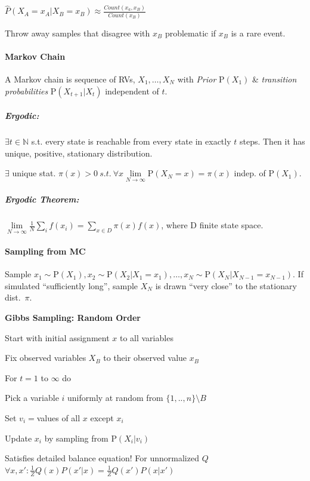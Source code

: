 \documentclass[a4paper, 10pt]{scrartcl}
\newcommand{\uP}{\mathrm P}
\begin{document}
\begin{multicols*}{3}
$\hat{P}(X_A = x_A | X_B = x_B) \approx \frac{Count(x_a, x_B)}{Count(x_B)}$

Throw away samples that disagree with $x_B$ problematic if $x_B$ is a rare event.

\paragraph{Markov Chain}

A Markov chain is sequence of RVs, $X_1,\dots,X_N$ with \emph{Prior} $\uP(X_1)$ \& \emph{transition probabilities} $\uP(X_{t+1} | X_t)$ independent of $t$.

\subparagraph{Ergodic:} $\exists t\in{\mathbb N}$ s.t. every state is reachable from every state in exactly $t$ steps.
Then it has unique, positive, stationary distribution.

$\exists$ unique stat. $\pi(x)>0\ s.t.\ \forall x \lim\limits_{N\rightarrow\infty}\uP(X_N = x)=\pi(x)$ indep. of $\uP(X_1)$.
\subparagraph{Ergodic Theorem:}$\lim\limits_{N\rightarrow\infty} \frac{1}{N}\sum_if(x_i)=\sum_{x\in D} \pi(x)f(x)$, where D finite state space.

\paragraph{Sampling from MC}
Sample $x_1 \sim \uP(X_1), x_2 \sim \uP(X_2 | X_1=x_1), \dots, x_N \sim \uP(X_N | X_{N-1}=x_{N-1})$.
If simulated “sufficiently long”, sample $X_N$ is drawn “very close” to the stationary dist.\ $\pi$.


\textbf{Gibbs Sampling: Random Order}
\begin{compactitem}
\item Start with initial assignment $x$ to all variables
\item Fix observed variables $X_B$ to their observed value $x_B$
\item For $t=1$ to $\infty$ do
\begin{compactenum}
\item Pick a variable $i$ uniformly at random from $\{1,..,n\} \setminus B$
\item Set $v_i = $values of all $x$ except $x_i$
\item Update $x_i$ by sampling from $\uP(X_i | v_i)$
\end{compactenum}
\end{compactitem}
Satisfies detailed balance equation! For unnormalized $Q$  $\forall x, x': \frac{1}{Z} Q(x)P(x'|x) = \frac{1}{Z} Q(x')P(x|x') $


\end{multicols*}
\end{document}
